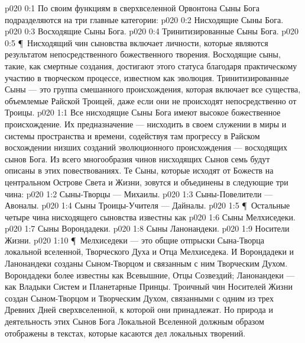 \author{Совершенствователь Мудрости}
\vs p020 0:1 По своим функциям в сверхвселенной Орвонтона Сыны Бога подразделяются на три главные категории:
\vs p020 0:2 \bibnobreakspace Нисходящие Сыны Бога.
\vs p020 0:3 \bibnobreakspace Восходящие Сыны Бога.
\vs p020 0:4 \bibnobreakspace Тринитизированные Сыны Бога.
\vs p020 0:5 \P\ Нисходящий чин сыновства включает личности, которые являются результатом непосредственного божественного творения. Восходящие сыны, такие, как смертные создания, достигают этого статуса благодаря практическому участию в творческом процессе, известном как эволюция. Тринитизированные Сыны --- это группа смешанного происхождения, которая включает все существа, объемлемые Райской Троицей, даже если они не происходят непосредственно от Троицы.
\vs p020 1:1 Все нисходящие Сыны Бога имеют высокое божественное происхождение. Их предназначение --- нисходить в своем служении в миры и системы пространства и времени, содействуя там прогрессу в Райском восхождении низших созданий эволюционного происхождения --- восходящих сынов Бога. Из всего многообразия чинов нисходящих Сынов семь будут описаны в этих повествованиях. Те Сыны, которые исходят от Божеств на центральном Острове Света и Жизни, зовутся  и объединены в следующие три чина:
\vs p020 1:2 \bibnobreakspace Сыны\hyp{}Творцы --- Михаилы.
\vs p020 1:3 \bibnobreakspace Сыны\hyp{}Повелители --- Авоналы.
\vs p020 1:4 \bibnobreakspace Сыны Троицы\hyp{}Учителя --- Дайналы.
\vs p020 1:5 \P\ Остальные четыре чина нисходящего сыновства известны как 
\vs p020 1:6 \bibnobreakspace Сыны Мелхиседеки.
\vs p020 1:7 \bibnobreakspace Сыны Ворондадеки.
\vs p020 1:8 \bibnobreakspace Сыны Ланонандеки.
\vs p020 1:9 \bibnobreakspace Носители Жизни.
\vs p020 1:10 \P\ Мелхиседеки --- это общие отпрыски Сына\hyp{}Творца локальной вселенной, Творческого Духа и Отца Мелхиседека. И Ворондадеки и Ланонандеки созданы Сыном\hyp{}Творцом и связанным с ним Творческим Духом. Ворондадеки более известны как Всевышние, Отцы Созвездий; Ланонандеки --- как Владыки Систем и Планетарные Принцы. Троичный чин Носителей Жизни создан Сыном\hyp{}Творцом и Творческим Духом, связанными с одним из трех Древних Дней сверхвселенной, к которой они принадлежат. Но природа и деятельность этих Сынов Бога Локальной Вселенной должным образом отображены в текстах, которые касаются дел локальных творений.
